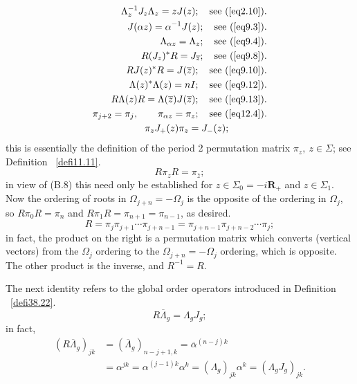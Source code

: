 \documentclass{surv-l}
\theoremstyle{plain}
\theoremstyle{definition}
\numberwithin{equation}{chapter}
\begin{document}
{\begin{align}\label{B.1}
\Lambda_{z}^{-1}J_{z}\Lambda_{z}=zJ(z);\quad \text{see (\ref{eq2.10})}.\\\label{B.2}
J(\alpha z)=\alpha^{-1}J(z);\quad \text{see (\ref{eq9.3})}.\\\label{B.3}
\Lambda_{\alpha z}=\Lambda_{z};\quad \text{see (\ref{eq9.4})}.\\\label{B.4}
R(J_{z})^{*}R=J_{\overline{z}};\quad \text{see (\ref{eq9.8})}.\\\label{B.5}
RJ(z)^{*}R=J(\overline{z});\quad \text{see (\ref{eq9.10})}.\\\label{B.6}
\Lambda(z)^{*}\Lambda(z)=nI;\quad \text{see (\ref{eq9.12})}.\\\label{B.7}
R\Lambda(z)R=\Lambda(\overline{z})J(\overline{z});\quad \text{see (\ref{eq9.13})}.\\\label{B.8}
\pi_{j+2}=\pi_{j},\qquad \pi_{\alpha z}=\pi_{z};\quad \text{see (\ref{eq12.4})}.\\\label{B.9}
\pi_{z}J_{+}(z)\pi_{z}=J_{-}(z);\qquad \qquad
\end{align}
this is essentially the definition of the period 2 permutation matrix $\pi_{z},\ z\in\Sigma$; see Definition ~\ref{defi11.11}.
\begin{equation}\label{eqB.10}
R\pi_{z}R=\pi_{\overline{z}};
\end{equation}
in view of (B.8) this need only be established for $z\in\Sigma_{0}=-i\textbf{R}_{+}$ and $z\in\Sigma_{1}$. Now the ordering of roots in $\Omega_{j+n}=-\Omega_{j}$ is the opposite of the ordering in $\Omega_{j}$, so $R\pi_{0}R=\pi_{n}$ and $R\pi_{1}R=\pi_{n+1}=\pi_{n-1}$, as desired.
\begin{equation}\label{eqB.11}
R=\pi_{j}\pi_{j+1}\cdots \pi_{j+n-1}=\pi_{j+n-1}\pi_{j+n-2}\cdots \pi_{j};
\end{equation}
in fact, the product on the right is a permutation matrix which converts (vertical vectors) from the $\Omega_{j}$ ordering to the $\Omega_{j+n}=-\Omega_{j}$ ordering, which is opposite. The other product is the inverse, and $R^{-1}=R$.

The next identity refers to the global order operators introduced in Definition ~\ref{defi38.22}.
\begin{equation}\label{eqB.12}
R\overline{\Lambda}_{g}=\Lambda_{g}J_{g};
\end{equation}
in fact,
\begin{align*}
(R\overline{\Lambda}_{g})_{jk} & =(\overline{\Lambda}_{g})_{n-j+1,k}=\overline{\alpha}^{(n-j)k}\\
& =\alpha^{j k}=\alpha^{(j-1)k}\alpha^{k}=(\Lambda_{g})_{j k}\alpha^{k}=(\Lambda_{g}J_{g})_{j k}.
\end{align*}

}
\end{document}
